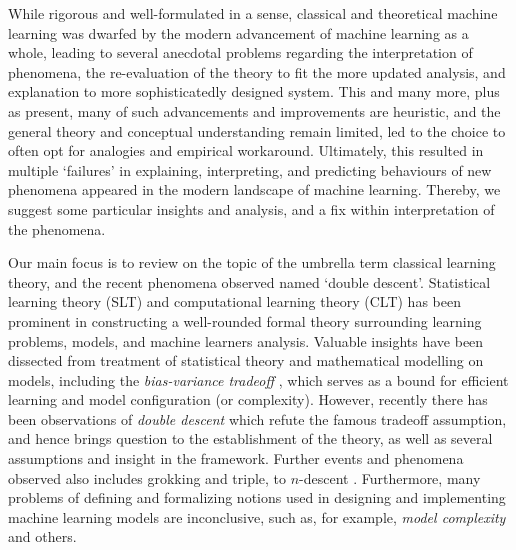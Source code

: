 \documentclass[10pt]{article} %
\begin{document}
While rigorous and well-formulated in a sense, classical and theoretical machine learning was dwarfed by the modern advancement of machine learning as a whole, leading to several anecdotal problems regarding the interpretation of phenomena, the re-evaluation of the theory to fit the more updated analysis, and explanation to more sophisticatedly designed system. This and many more, plus as present, many of such advancements and improvements are heuristic, and the general theory and conceptual understanding remain limited, led to the choice to often opt for analogies and empirical workaround. Ultimately, this resulted in multiple `failures' in explaining, interpreting, and predicting behaviours of new phenomena appeared in the modern landscape of machine learning. Thereby, we suggest some particular insights and analysis, and a fix within interpretation of the phenomena. 

Our main focus is to review on the topic of the umbrella term classical learning theory, and the recent phenomena observed named `double descent'. Statistical learning theory (SLT) and computational learning theory (CLT) \cite{Vapnik1999-VAPTNO,10.5555/2371238,10.5555/2621980,STL_Hajek_Maxim_2021,bousquet2020theoryuniversallearning} has been prominent in constructing a well-rounded formal theory surrounding learning problems, models, and machine learners analysis. Valuable insights have been dissected from treatment of statistical theory and mathematical modelling on models, including the \textit{bias-variance tradeoff} \cite{6797087,Domingos2000AUB}, which serves as a bound for efficient learning and model configuration (or complexity). However, recently there has been observations of \textit{double descent} \cite{belkin_reconciling_2019,schaeffer_double_2023,nakkiran_deep_2019,lafon_understanding_2024} which refute the famous tradeoff assumption, and hence brings question to the establishment of the theory, as well as several assumptions and insight in the framework. Further events and phenomena observed also includes grokking and triple, to $n$-descent \cite{davies_unifying_2023,d_ascoli_triple_2020}. Furthermore, many problems of defining and formalizing notions used in designing and implementing machine learning models are inconclusive, such as, for example, \textit{model complexity} and others. 
\end{document}
